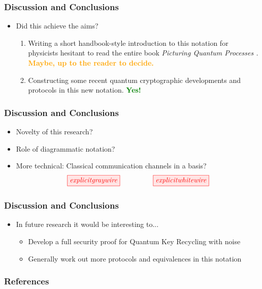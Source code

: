 \documentclass[]{beamer}
\begin{document}
\begin{frame}
	\frametitle{Discussion and Conclusions}
	\begin{itemize}
		\item Did this achieve the aims?\pause
		\begin{enumerate}
			\item Writing a short handbook-style introduction to this notation for physicists hesitant to read the entire book \textit{Picturing Quantum Processes \cite{Coecke2017}.}\pause \newline
			\textcolor{orange}{\textbf{Maybe, up to the reader to decide.}}\pause
			\vspace{0.8cm}
			\item Constructing some recent quantum cryptographic developments and protocols in this new notation.\pause \newline
			\textcolor{green}{\textbf{Yes!}}
		\end{enumerate}
	\end{itemize}
\end{frame}

\begin{frame}
	\frametitle{Discussion and Conclusions}
	\begin{itemize}
	\item Novelty of this research?
	\item Role of diagrammatic notation?
	\item More technical: Classical communication channels in a basis?
	\begin{equation}
		\tikzfig{explicitgraywire} ~~~~~~~~~~~~~~ \tikzfig{explicitwhitewire}
	\end{equation}
	\end{itemize}
\end{frame}

\begin{frame}
	\frametitle{Discussion and Conclusions}
	\begin{itemize}
		\item In future research it would be interesting to...
		\begin{itemize}
			\item Develop a full security proof for Quantum Key Recycling with noise
			\item Generally work out more protocols and equivalences in this notation
		\end{itemize}
	\end{itemize}
\end{frame}

\begin{frame}
		\centering 
		\Huge
\end{frame}
\begin{frame}
	\frametitle{References}

	
	
\end{frame}
\end{document}
